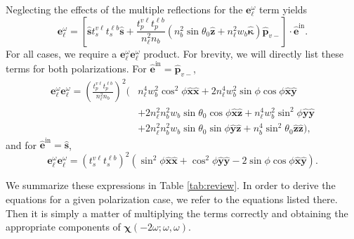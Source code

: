 Neglecting the effects of the multiple reflections for the
$\mathbf{e}^{\omega}_{\ell}$ term yields
\begin{equation*}\label{eqapp:ewell}
\mathbf{e}^{\omega}_{\ell} = 
\left[
\hat{\mathbf{s}}t_{s}^{v\ell}t_{s}^{\ell b}\hat{\mathbf{s}} 
+ \frac{t^{v\ell}_{p}t^{\ell b}_{p}}{n^{2}_{\ell}n_{b}}
\left(
  n^{2}_{b}\sin\theta_{0}\hat{\mathbf{z}} 
+ n^{2}_{\ell}w_{b}\hat{\boldsymbol{\kappa}}
\right)
\hat{\mathbf{p}}_{v-}
\right]
\cdot\hat{\mathbf{e}}^{\mathrm{in}}.
\end{equation*}
For all cases, we require a
$\mathbf{e}^{\omega}_{\ell}\mathbf{e}^{\omega}_{\ell}$ product. For brevity, we
will directly list these terms for both polarizations. For
$\hat{\mathbf{e}}^{\mathrm{in}} = \hat{\mathbf{p}}_{v-}$,
\begin{equation}\label{eqapp:ewewp}
\begin{split}
\mathbf{e}^{\omega}_{\ell}\mathbf{e}^{\omega}_{\ell}
= \left(\frac{t^{v\ell}_{p}t^{\ell b}_{p}}
{n^{2}_{\ell}n_{b}}\right)^{2}
\big(
  &n^{4}_{\ell}w^{2}_{b}\cos^{2}\phi
\hat{\mathbf{x}}\hat{\mathbf{x}}
+ 2n^{4}_{\ell}w^{2}_{b}\sin\phi\cos\phi
\hat{\mathbf{x}}\hat{\mathbf{y}}\\
&+ 2n^{2}_{\ell}n^{2}_{b}w_{b}\sin\theta_{0}\cos\phi
\hat{\mathbf{x}}\hat{\mathbf{z}}
+ n^{4}_{\ell}w^{2}_{b}\sin^{2}\phi
\hat{\mathbf{y}}\hat{\mathbf{y}}\\
&+ 2n^{2}_{\ell}n^{2}_{b}w_{b}\sin\theta_{0}\sin\phi
\hat{\mathbf{y}}\hat{\mathbf{z}}
+ n^{4}_{b}\sin^{2}\theta_{0}
\hat{\mathbf{z}}\hat{\mathbf{z}}
\big),
\end{split}
\end{equation}
and for $\hat{\mathbf{e}}^{\mathrm{in}} = \hat{\mathbf{s}}$,
\begin{equation}\label{eqapp:ewews}
\mathbf{e}^{\omega}_{\ell}\mathbf{e}^{\omega}_{\ell}
= \left(t^{v\ell}_{s}t^{\ell b}_{s}\right)^{2}
\left(
  \sin^{2}\phi\hat{\mathbf{x}}\hat{\mathbf{x}}
+ \cos^{2}\phi\hat{\mathbf{y}}\hat{\mathbf{y}} 
- 2\sin\phi\cos\phi\hat{\mathbf{x}}\hat{\mathbf{y}}
\right).
\end{equation}

We summarize these expressions in Table \ref{tab:review}. In order to derive the
equations for a given polarization case, we refer to the equations listed there.
Then it is simply a matter of multiplying the terms correctly and obtaining the
appropriate components of $\boldsymbol{\chi}(-2\omega; \omega, \omega)$.

